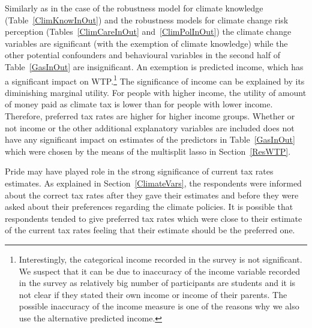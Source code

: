 \documentclass[a4paper,12pt]{article}
\begin{document}
Similarly as in the case of the robustness model for climate knowledge (Table~\ref{ClimKnowInOut}) and the robustness models for climate change risk perception (Tables~\ref{ClimCareInOut} and~\ref{ClimPolInOut}) the climate change variables are significant (with the exemption of climate knowledge) while the other potential confounders and behavioural variables in the second half of Table~\ref{GasInOut} are insignificant. An exemption is predicted income, which has a significant impact on WTP.\footnote{Interestingly, the categorical income recorded in the survey \citep{SurveyUK} is not significant. We suspect that it can be due to inaccuracy of the income variable recorded in the survey as relatively big number of participants are students and it is not clear if they stated their own income or income of their parents. The possible inaccuracy of the income measure is one of the reasons why we also use the alternative predicted income.} The significance of income can be explained by its diminishing marginal utility. For people with higher income, the utility of amount of money paid as climate tax is lower than for people with lower income. Therefore, preferred tax rates are higher for higher income groups. Whether or not income or the other additional explanatory variables are included does not have any significant impact on estimates of the predictors in Table~\ref{GasInOut} which were chosen by the means of the multisplit lasso in Section~\ref{ResWTP}.


Pride may have played role in the strong significance of current tax rates estimates. As explained in Section~\ref{ClimateVars}, the respondents were informed about the correct tax rates after they gave their estimates and before they were asked about their preferences regarding the climate policies.  It is possible that respondents tended to give preferred tax rates which were close to their estimate of the current tax rates feeling that their estimate should be the preferred one.
\end{document}
